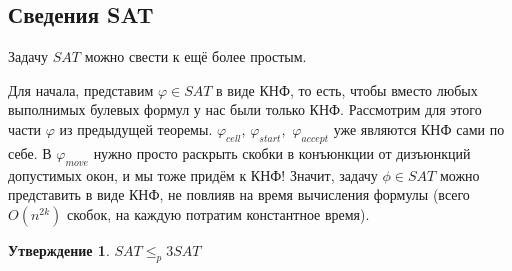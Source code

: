 \documentclass[a4paper,12pt]{article}
\newtheorem{statement}{Утверждение}
\begin{document}
\subsection{Сведения SAT}
Задачу $SAT$ можно свести к ещё более простым.

Для начала, представим $\varphi \in SAT$ в виде КНФ, то есть, чтобы вместо любых выполнимых булевых формул у нас были только КНФ. Рассмотрим для этого части $\varphi$ из предыдущей теоремы. $\varphi_{cell}$, $\varphi_{start}$,\ $\varphi_{accept}$ уже являются КНФ сами по себе. В $\varphi_{move}$ нужно просто раскрыть скобки в конъюнкции от дизъюнкций допустимых окон, и мы тоже придём к КНФ! Значит, задачу $\phi \in SAT$ можно представить в виде КНФ, не повлияв на время вычисления формулы (всего $O(n^{2k})$ скобок, на каждую потратим константное время).
\begin{statement}
    $SAT \leqslant_p 3SAT$
\end{statement}
\end{document}
